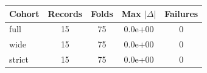 \begin{tabular}{lcccc}
\toprule
Cohort & Records & Folds & Max $|\Delta|$ & Failures \\
\midrule
full & 15 & 75 & 0.0e+00 & 0 \\
wide & 15 & 75 & 0.0e+00 & 0 \\
strict & 15 & 75 & 0.0e+00 & 0 \\
\bottomrule
\end{tabular}
